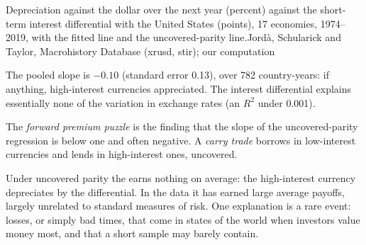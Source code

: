 \begin{omchart}{Depreciation against the dollar over the next year (percent) against
the short-term interest differential with the United States (points), 17
economies, 1974--2019, with the fitted line and the uncovered-parity
line.}{Jordà, Schularick and Taylor, Macrohistory Database (xrusd, stir); our
computation}
\end{omchart}

The pooled slope is $-0.10$ (standard error 0.13), over 782 country-years: if
anything, high-interest currencies appreciated. The interest differential
explains essentially none of the variation in exchange rates (an $R^2$ under 0.001).

\begin{definition}\label{def:b3:exchange-rates:forward-premium}
The \emph{forward premium puzzle} is the finding that the slope of the
uncovered-parity regression is below one and often negative. A \emph{carry trade}
borrows in low-interest currencies and lends in high-interest ones, uncovered.
\end{definition}

\begin{record}
Under uncovered parity the  earns nothing on average: the
high-interest currency depreciates by the differential. In the data it has earned
large average payoffs, largely unrelated to standard measures of risk. One
explanation is a rare event: losses, or simply bad times, that come in states of
the world when investors value money most, and that a short sample may barely
contain.
\end{record}

